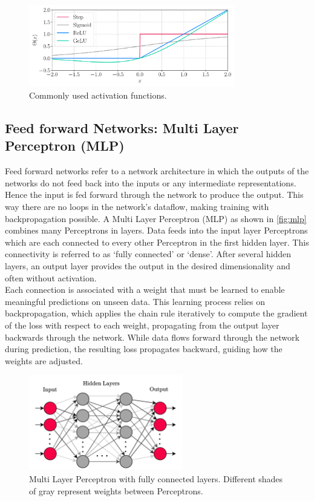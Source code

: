 \begin{figure}[H]
    \centering
    \includegraphics[width=0.8\textwidth]{../fig/background/activation_functions.pdf}
    \caption{Commonly used activation functions.}
    \label{fig:activation_functions}
\end{figure}
\subsection{Feed forward Networks: Multi Layer Perceptron (MLP)}
\label{subsec:background_mlp}
Feed forward networks refer to a network architecture in which the outputs of the networks do not feed back into the inputs or any intermediate representations. Hence the input is fed forward through the network to produce the output. This way there are no loops in the network's dataflow, making training with backpropagation possible. A Multi Layer Perceptron (MLP) as shown in \autoref{fig:mlp} combines many Perceptrons in layers. Data feeds into the input layer Perceptrons which are each connected to every other Perceptron in the first hidden layer. This connectivity is referred to as `fully connected' or `dense'. After several hidden layers, an output layer provides the output in the desired dimensionality and often without activation.\\
Each connection is associated with a weight that must be learned to enable meaningful predictions on unseen data. This learning process relies on backpropagation, which applies the chain rule iteratively to compute the gradient of the loss with respect to each weight, propagating from the output layer backwards through the network. While data flows forward through the network during prediction, the resulting loss propagates backward, guiding how the weights are adjusted. \\
\begin{figure}[h]
    \centering
    \includegraphics[width=0.6\textwidth]{../fig/background/MLP.pdf}
    \caption[Multi Layer Perceptron]{Multi Layer Perceptron with fully connected layers. Different shades of gray represent weights between Perceptrons.}
    \label{fig:mlp}
\end{figure}


